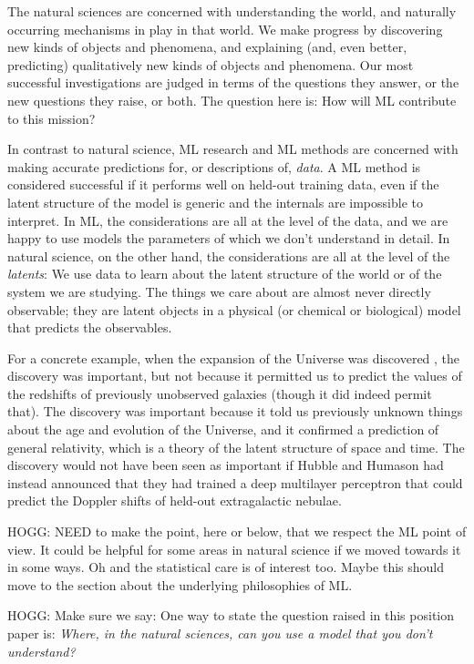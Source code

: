 \documentclass[11pt]{article}
\begin{document}
The natural sciences are concerned with understanding the world, and naturally occurring mechanisms in play in that world.
We make progress by discovering new kinds of objects and phenomena, and explaining (and, even better, predicting) qualitatively new kinds of objects and phenomena.
Our most successful investigations are judged in terms of the questions they answer, or the new questions they raise, or both.
The question here is: How will ML contribute to this mission?

In contrast to natural science, ML research and ML methods are concerned with making accurate predictions for, or descriptions of, \emph{data}.
A ML method is considered successful if it performs well on held-out training data, even if the latent structure of the model is generic and the internals are impossible to interpret.
In ML, the considerations are all at the level of the data, and we are happy to use models the parameters of which we don't understand in detail.
In natural science, on the other hand, the considerations are all at the level of the \emph{latents}:
We use data to learn about the latent structure of the world or of the system we are studying.
The things we care about are almost never directly observable; they are latent objects in a physical (or chemical or biological) model that predicts the observables.

For a concrete example, when the expansion of the Universe was discovered \cite{expansion, expansion2}, the discovery was important, but not because it permitted us to predict the values of the redshifts of previously unobserved galaxies (though it did indeed permit that).
The discovery was important because it told us previously unknown things about the age and evolution of the Universe, and it confirmed a prediction of general relativity, which is a theory of the latent structure of space and time.
The discovery would not have been seen as important if Hubble and Humason had instead announced that they had trained a deep multilayer perceptron that could predict the Doppler shifts of held-out extragalactic nebulae.

HOGG: NEED to make the point, here or below, that we respect the ML point of view. It could be helpful for some areas in natural science if we moved towards it in some ways. Oh and the statistical care is of interest too. Maybe this should move to the section about the underlying philosophies of ML.

HOGG: Make sure we say: One way to state the question raised in this position paper is:
\emph{Where, in the natural sciences, can you use a model that you don't understand?}
\end{document}
